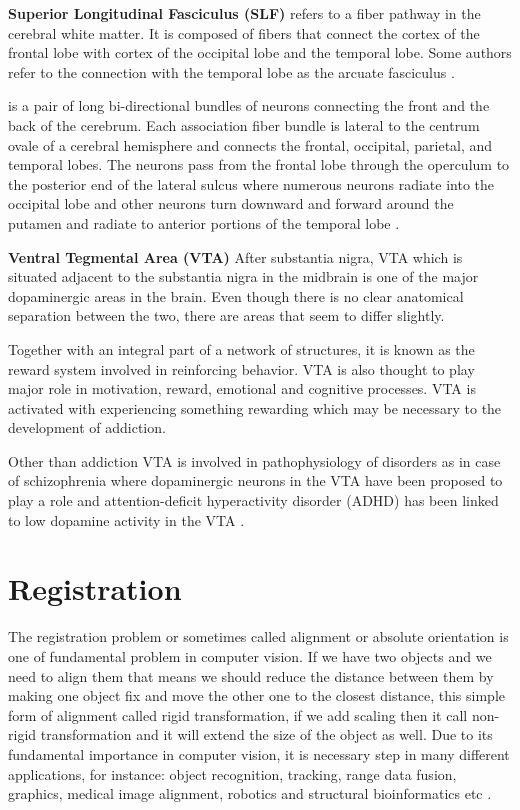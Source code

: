 \documentclass[../structure.tex]{subfiles}
\begin{document}
		\textbf{Superior Longitudinal Fasciculus (SLF)}
		refers to a fiber pathway in the cerebral white matter. It is composed of fibers that connect the cortex of the frontal lobe with cortex of the occipital lobe and the temporal lobe. Some authors refer to the connection with the temporal lobe as the arcuate fasciculus \cite{Washington1994}.
		
		is a pair of long bi-directional bundles of neurons connecting the front and the back of the cerebrum. Each association fiber bundle is lateral to the centrum ovale of a cerebral hemisphere and connects the frontal, occipital, parietal, and temporal lobes. The neurons pass from the frontal lobe through the operculum to the posterior end of the lateral sulcus where numerous neurons radiate into the occipital lobe and other neurons turn downward and forward around the putamen and radiate to anterior portions of the temporal lobe \cite{PDD2015}.
		
		\textbf{Ventral Tegmental Area (VTA)}
		After substantia nigra, VTA which is situated adjacent to the substantia nigra in the midbrain is one of the major dopaminergic areas in the brain. Even though there is no clear anatomical separation between the two, there are areas that seem to differ slightly.

Together with an integral part of a network of structures, it is known as the reward system involved in reinforcing behavior. VTA is also thought to play major role in motivation, reward, emotional and cognitive processes. VTA is activated with experiencing something rewarding which may be necessary to the development of addiction. 

Other than addiction VTA is involved in pathophysiology of disorders as in case of schizophrenia where dopaminergic neurons in the VTA have been proposed to play a role and attention-deficit hyperactivity disorder (ADHD) has been linked to low dopamine activity in the VTA \cite{Kalivas1993}.
	
	
\section{Registration}
	The registration problem or sometimes called alignment or absolute orientation is one of fundamental problem in computer vision. If we have two objects and we need to align them that means we should reduce the distance between them by making one object fix and move the other one to the closest distance, this simple form of alignment called rigid transformation, if we add scaling then it call non-rigid transformation and it will extend the size of the object as well. Due to its fundamental importance in computer vision, it is necessary step in many different applications, for instance: object recognition, tracking, range data fusion, graphics, medical image alignment, robotics and structural bioinformatics etc \cite{Li2007}.
\end{document}
